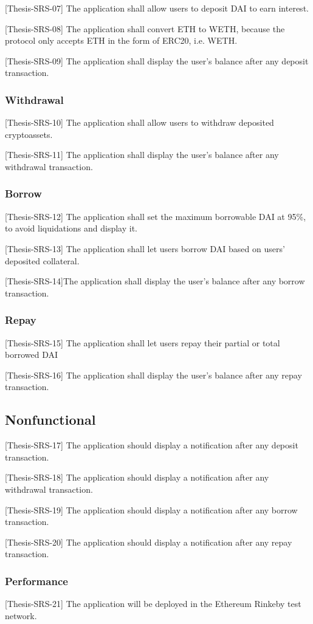 \documentclass[11pt,a4paper]{report}
\begin{document}
[Thesis-SRS-07] The application shall allow users to deposit DAI to earn interest.

[Thesis-SRS-08] The application shall convert ETH to WETH, because the protocol only accepts ETH in the form of ERC20, i.e. WETH.

[Thesis-SRS-09] The application shall display the user's balance after any deposit transaction.

\subsubsection{Withdrawal}
[Thesis-SRS-10] The application shall allow users to withdraw deposited cryptoassets.

[Thesis-SRS-11] The application shall display the user's balance after any withdrawal transaction.

\subsubsection{Borrow}
[Thesis-SRS-12] The application shall set the maximum borrowable DAI at 95\%, to avoid liquidations and display it.

[Thesis-SRS-13] The application shall let users borrow DAI based on users' deposited collateral.

[Thesis-SRS-14]The application shall display the user's balance after any borrow transaction.
\subsubsection{Repay}
[Thesis-SRS-15] The application shall let users repay their partial or total borrowed DAI 

[Thesis-SRS-16] The application shall display the user's balance after any repay transaction.
\subsection{Nonfunctional}

[Thesis-SRS-17] The application should display a notification after any deposit transaction.

[Thesis-SRS-18] The application should display a notification after any withdrawal transaction.

[Thesis-SRS-19] The application should display a notification after any borrow transaction.

[Thesis-SRS-20] The application should display a notification after any repay transaction.
\subsubsection{Performance}
[Thesis-SRS-21] The application will be deployed in the Ethereum Rinkeby test network.
\end{document}
